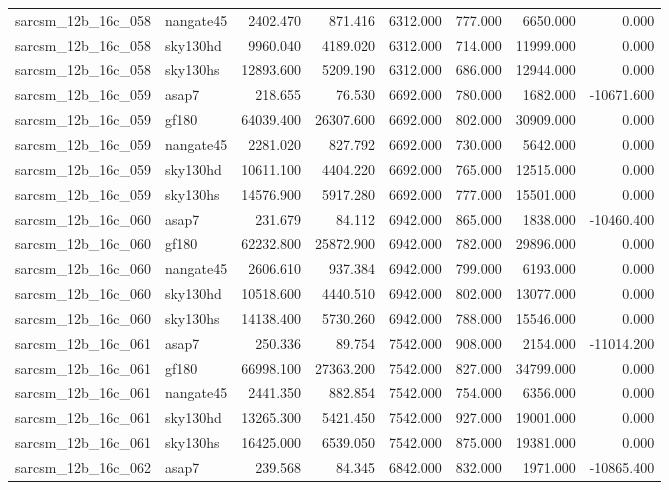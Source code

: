 \begin{tabular}{llrrrrrr}
sarcsm\_12b\_16c\_058 & nangate45 & 2402.470 & 871.416 & 6312.000 & 777.000 & 6650.000 & 0.000 \\
sarcsm\_12b\_16c\_058 & sky130hd & 9960.040 & 4189.020 & 6312.000 & 714.000 & 11999.000 & 0.000 \\
sarcsm\_12b\_16c\_058 & sky130hs & 12893.600 & 5209.190 & 6312.000 & 686.000 & 12944.000 & 0.000 \\
sarcsm\_12b\_16c\_059 & asap7 & 218.655 & 76.530 & 6692.000 & 780.000 & 1682.000 & -10671.600 \\
sarcsm\_12b\_16c\_059 & gf180 & 64039.400 & 26307.600 & 6692.000 & 802.000 & 30909.000 & 0.000 \\
sarcsm\_12b\_16c\_059 & nangate45 & 2281.020 & 827.792 & 6692.000 & 730.000 & 5642.000 & 0.000 \\
sarcsm\_12b\_16c\_059 & sky130hd & 10611.100 & 4404.220 & 6692.000 & 765.000 & 12515.000 & 0.000 \\
sarcsm\_12b\_16c\_059 & sky130hs & 14576.900 & 5917.280 & 6692.000 & 777.000 & 15501.000 & 0.000 \\
sarcsm\_12b\_16c\_060 & asap7 & 231.679 & 84.112 & 6942.000 & 865.000 & 1838.000 & -10460.400 \\
sarcsm\_12b\_16c\_060 & gf180 & 62232.800 & 25872.900 & 6942.000 & 782.000 & 29896.000 & 0.000 \\
sarcsm\_12b\_16c\_060 & nangate45 & 2606.610 & 937.384 & 6942.000 & 799.000 & 6193.000 & 0.000 \\
sarcsm\_12b\_16c\_060 & sky130hd & 10518.600 & 4440.510 & 6942.000 & 802.000 & 13077.000 & 0.000 \\
sarcsm\_12b\_16c\_060 & sky130hs & 14138.400 & 5730.260 & 6942.000 & 788.000 & 15546.000 & 0.000 \\
sarcsm\_12b\_16c\_061 & asap7 & 250.336 & 89.754 & 7542.000 & 908.000 & 2154.000 & -11014.200 \\
sarcsm\_12b\_16c\_061 & gf180 & 66998.100 & 27363.200 & 7542.000 & 827.000 & 34799.000 & 0.000 \\
sarcsm\_12b\_16c\_061 & nangate45 & 2441.350 & 882.854 & 7542.000 & 754.000 & 6356.000 & 0.000 \\
sarcsm\_12b\_16c\_061 & sky130hd & 13265.300 & 5421.450 & 7542.000 & 927.000 & 19001.000 & 0.000 \\
sarcsm\_12b\_16c\_061 & sky130hs & 16425.000 & 6539.050 & 7542.000 & 875.000 & 19381.000 & 0.000 \\
sarcsm\_12b\_16c\_062 & asap7 & 239.568 & 84.345 & 6842.000 & 832.000 & 1971.000 & -10865.400 \\

\end{tabular}
